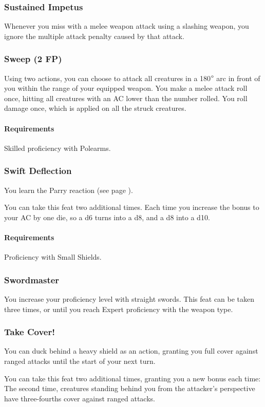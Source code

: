 \subsubsection{Sustained Impetus} \label{feat::sustainedimpetus}
    Whenever you miss with a melee weapon attack using a slashing weapon, you ignore the multiple attack penalty caused by that attack.
\subsubsection{Sweep (2 FP)} \label{feat::sweep}
    Using two actions, you can choose to attack all creatures in a 180$\degree$ arc in front of you within the range of your equipped weapon.
    You make a melee attack roll once, hitting all creatures with an AC lower than the number rolled.
    You roll damage once, which is applied on all the struck creatures.
    \paragraph{Requirements} Skilled proficiency with Polearms.
\subsubsection{Swift Deflection} \label{feat::swiftdeflection}
    You learn the Parry reaction (see page \pageref{act::parry}).

    You can take this feat two additional times.
    Each time you increase the bonus to your AC by one die, so a d6 turns into a d8, and a d8 into a d10.
    \paragraph{Requirements} Proficiency with Small Shields.
\subsubsection{Swordmaster} \label{feat::swordmaster}
    You increase your proficiency level with straight swords.
    This feat can be taken three times, or until you reach Expert proficiency with the weapon type.
\subsubsection{Take Cover!} \label{feat::takecover}
    You can duck behind a heavy shield as an action, granting you full cover against ranged attacks until the start of your next turn.

    You can take this feat two additional times, granting you a new bonus each time:
    The second time, creatures standing behind you from the attacker's perspective have three-fourths cover against ranged attacks.

